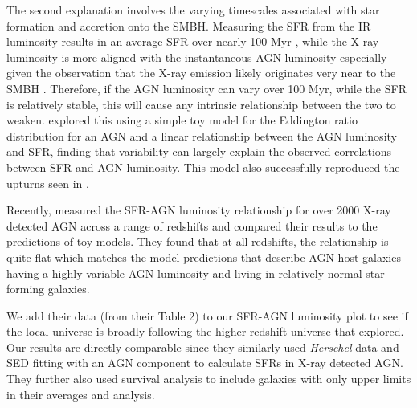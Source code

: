 \documentclass[fleqn, usenatbib]{mnras}
\newcommand{\herschel}{\emph{Herschel}}
\begin{document}
The second explanation involves the varying timescales associated with star formation and accretion onto the SMBH. Measuring the SFR from the IR luminosity results in an average SFR over nearly 100 Myr \citep{Kennicutt:2012it}, while the X-ray luminosity is more aligned with the instantaneous AGN luminosity especially given the observation that the X-ray emission likely originates very near to the SMBH \citep[e.g.][]{Chen:2011lr}. Therefore, if the AGN luminosity can vary over 100 Myr, while the SFR is relatively stable, this will cause any intrinsic relationship between the two to weaken. \citet{Hickox:2014yq} explored this using a simple toy model for the Eddington ratio distribution for an AGN and a linear relationship between the AGN luminosity and SFR, finding that variability can largely explain the observed correlations between SFR and AGN luminosity. This model also successfully reproduced the upturns seen in \citet{Rosario:2012fr}.

Recently, \citet{Stanley:2015qy} measured the SFR-AGN luminosity relationship for over 2000 X-ray detected AGN across a range of redshifts and compared their results to the predictions of toy models. They found that at all redshifts, the relationship is quite flat which matches the model predictions that describe AGN host galaxies having a highly variable AGN luminosity and living in relatively normal star-forming galaxies. 

We add their data (from their Table 2) to our SFR-AGN luminosity plot to see if the local universe is broadly following the higher redshift universe that \citet{Stanley:2015qy} explored. Our results are directly comparable since they similarly used \herschel{} data and SED fitting with an AGN component to calculate SFRs in X-ray detected AGN. They further also used survival analysis to include galaxies with only upper limits in their averages and analysis.
\end{document}
